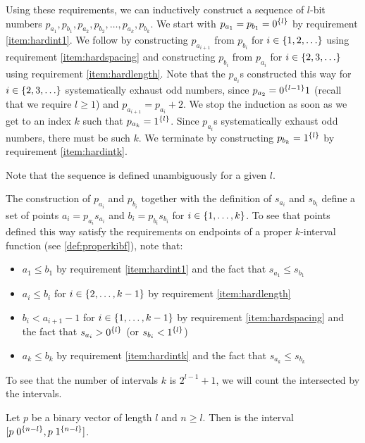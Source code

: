 Using these requirements,
we can inductively construct a sequence of $l$-bit numbers
$p_{a_1}, p_{b_1}, p_{a_2}, p_{b_2}, \ldots,
p_{a_k}, p_{b_k}$.
We start with
$p_{a_1} = p_{b_1} = 0^{\{l\}}$
by requirement \ref{item:hardint1}.
We follow by
constructing $p_{a_{i+1}}$ from $p_{b_i}$
for $i \in \{1, 2, \ldots\}$
using requirement \ref{item:hardspacing} and
constructing $p_{b_i}$ from $p_{a_i}$
for $i \in \{2, 3, \ldots\}$
using requirement \ref{item:hardlength}.
Note that the $p_{a_i}$s constructed this way
for $i \in \{2, 3, \ldots\}$
systematically
exhaust odd numbers,
since $p_{a_2} = 0^{\{l-1\}} 1$
(recall that we require $l \geq 1$)
and $p_{a_{i+1}} = p_{a_i} + 2$.
We stop the induction
as soon as we get to an index $k$ such that
$p_{a_k} = 1^{\{l\}}$.
Since $p_{a_i}$s systematically exhaust odd numbers,
there must be such $k$.
We terminate by constructing $p_{b_k} = 1^{\{l\}}$
by requirement \ref{item:hardintk}.

Note that the sequence is defined unambiguously
for a given $l$.

The construction of $p_{a_i}$ and $p_{b_i}$
together with the definition
of $s_{a_i}$ and $s_{b_i}$ define a set of points
$a_i = p_{a_i} s_{a_i}$ and $b_i = p_{b_i} s_{b_i}$
for $i \in \{1, \ldots, k\}$.
To see that points defined this way
satisfy the requirements on endpoints
of a proper $k$-interval function
(see \cref{def:properkibf}),
note that:

\begin{itemize}
\item $a_1 \leq b_1$ by requirement \ref{item:hardint1}
and the fact that $s_{a_1} \leq s_{b_1}$
\item $a_i \leq b_i$
for $i \in \{2, \ldots, k-1\}$
by requirement \ref{item:hardlength}
\item $b_i < a_{i+1} - 1$
for $i \in \{1, \ldots, k-1\}$
by requirement \ref{item:hardspacing}
and the fact that $s_{a_i} > 0^{\{l\}}$
(or $s_{b_i} < 1^{\{l\}}$)
\item $a_k \leq b_k$ by requirement \ref{item:hardintk}
and the fact that $s_{a_k} \leq s_{b_k}$
\end{itemize}

To see that the number of intervals $k$ is $2^{l-1} + 1$,
we will count the 
intersected by the intervals.

\begin{definition}[Subtree]
Let $p$ be a binary vector of length $l$
and $n \geq l$.
Then  is the interval
$[p \; 0^{\{n-l\}}, p \; 1^{\{n-l\}}]$.
\end{definition}

